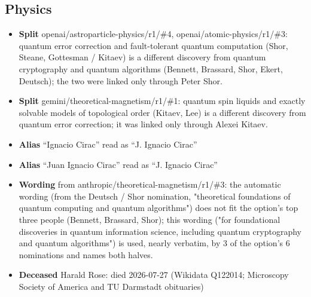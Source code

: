 \documentclass[11pt]{article}
\begin{document}
\subsection*{Physics}
\begin{itemize}[leftmargin=*]
\item \textbf{Split} openai/astroparticle-physics/r1/\#4, openai/atomic-physics/r1/\#3: quantum error correction and fault-tolerant quantum computation (Shor, Steane, Gottesman / Kitaev) is a different discovery from quantum cryptography and quantum algorithms (Bennett, Brassard, Shor, Ekert, Deutsch); the two were linked only through Peter Shor.
\item \textbf{Split} gemini/theoretical-magnetism/r1/\#1: quantum spin liquids and exactly solvable models of topological order (Kitaev, Lee) is a different discovery from quantum error correction; it was linked only through Alexei Kitaev.
\item \textbf{Alias} ``Ignacio Cirac'' read as ``J. Ignacio Cirac''
\item \textbf{Alias} ``Juan Ignacio Cirac'' read as ``J. Ignacio Cirac''
\item \textbf{Wording} from anthropic/theoretical-magnetism/r1/\#3: the automatic wording (from the Deutsch / Shor nomination, "theoretical foundations of quantum computing and quantum algorithms") does not fit the option's top three people (Bennett, Brassard, Shor); this wording ("for foundational discoveries in quantum information science, including quantum cryptography and quantum algorithms") is used, nearly verbatim, by 3 of the option's 6 nominations and names both halves.
\item \textbf{Deceased} Harald Rose: died 2026-07-27 (Wikidata Q122014; Microscopy Society of America and TU Darmstadt obituaries)
\end{itemize}
\end{document}
